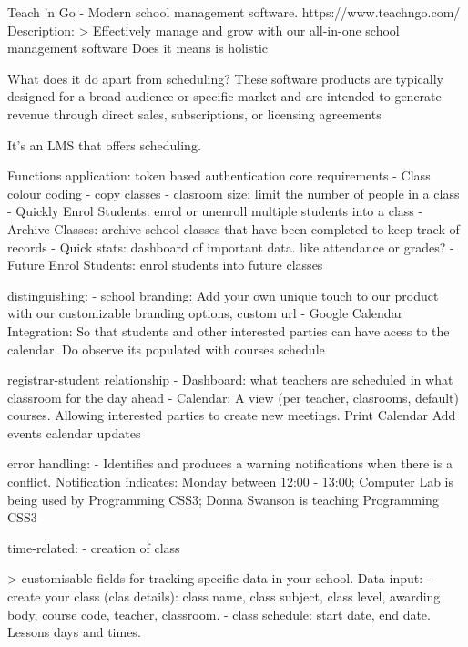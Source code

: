 Teach 'n Go - Modern school management software. https://www.teachngo.com/
Description: 
> Effectively manage and grow with our all-in-one school management software
Does it means is holistic

What does it do apart from scheduling?
These software products are typically designed for a broad audience or specific market and are intended to generate revenue through direct sales, subscriptions, or licensing agreements

It's an LMS that offers scheduling.

Functions
    application: token based authentication
        core requirements
            - Class colour coding
            - copy classes
            - clasroom size: limit the number of people in a class
            - Quickly Enrol Students: enrol or unenroll multiple students into a class
            - Archive Classes: archive school classes that have been completed to keep track of records
            - Quick stats: dashboard of important data. like attendance or grades?
            - Future Enrol Students: enrol students into future classes

        distinguishing:
            - school branding: Add your own unique touch to our product with our customizable branding options, custom url
            - Google Calendar Integration: So that students and other interested parties can have acess to the calendar. Do observe its populated with courses schedule

        registrar-student relationship
            - Dashboard: what teachers are scheduled in what classroom for the day ahead
            - Calendar: A view (per teacher, clasrooms, default) courses. Allowing interested parties to create new meetings.
                Print Calendar
                Add events
                calendar updates

    error handling:
        - Identifies and produces a warning notifications when there is a conflict. Notification indicates: Monday between 12:00 - 13:00; Computer Lab is being used by Programming CSS3; Donna Swanson is teaching Programming CSS3

    time-related:
        - creation of class


> customisable fields for tracking specific data in your school.
Data
    input:
        - create your class (clas details): class name, class subject, class level, awarding body, course code, teacher, classroom.
        - class schedule: start date, end date. Lessons days and times.

